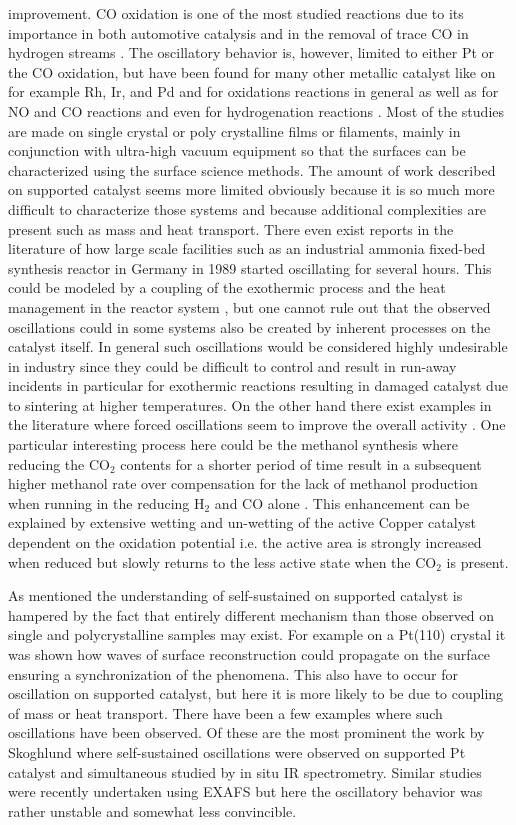 \documentclass[journal=jacsat,manuscript=article]{achemso}
\begin{document}
improvement. CO oxidation is one of the most studied reactions due to its
importance in both automotive catalysis and in the removal of trace CO in
hydrogen streams \cite{IbsBog}. The oscillatory behavior is, however, limited
to either Pt or the CO oxidation, but have been found for many other metallic
catalyst like on for example Rh, Ir, and Pd and for oxidations reactions in
general as well as for NO and CO reactions and even for hydrogenation reactions
\cite{Lund2000,SALES1982}. Most of the studies are made on single crystal or
poly crystalline films or filaments, mainly in conjunction with ultra-high
vacuum equipment so that the surfaces can be characterized using the surface
science methods. The amount of work described on supported catalyst seems more
limited obviously because it is so much more difficult to characterize those
systems and because additional complexities are present such as mass and heat
transport. There even exist reports in the literature of how large scale
facilities such as an industrial ammonia fixed-bed synthesis reactor in Germany
in 1989 started oscillating for several hours. This could be modeled by a
coupling of the exothermic process and the heat management in the reactor
system \cite{Morud1998}, but one cannot rule out that the observed oscillations
could in some systems also be created by inherent processes on the catalyst
itself. In general such oscillations would be considered highly undesirable in
industry since they could be difficult to control and result in run-away
incidents in particular for exothermic reactions resulting in damaged catalyst
due to sintering at higher temperatures. On the other hand there exist examples
in the literature where forced oscillations seem to improve the overall
activity \cite{IMBIHL1995,Machado2005} . One particular interesting process
here could be the methanol synthesis where reducing the CO$_2$ contents for a
shorter period of time result in a subsequent higher methanol rate over
compensation for the lack of methanol production when running in the reducing
H$_2$ and CO alone \cite{Dynamics-Bog}. This enhancement can be explained by
extensive wetting and un-wetting of the active Copper catalyst dependent on the
oxidation potential \cite{Hansen2002} i.e. the active area is strongly
increased when reduced but slowly returns to the less active state when the
CO$_2$ is present.

As mentioned the understanding of self-sustained on supported catalyst is
hampered by the fact that entirely different mechanism than those observed on
single and polycrystalline samples may exist. For example on a Pt(110) crystal
it was shown how waves of surface reconstruction could propagate on the
surface ensuring a synchronization of the phenomena. This also have to occur
for oscillation on supported catalyst, but here it is more likely to be due to
coupling of mass or heat transport. There have been a few examples where such
oscillations have been observed. Of these are the most prominent the work by
Skoghlund \cite{Carlsson2006} where self-sustained oscillations were observed
on supported Pt catalyst and simultaneous studied by in situ IR spectrometry.
Similar studies were recently undertaken using EXAFS \cite{Singh2010} but here
the oscillatory behavior was rather unstable and somewhat less convincible.
\end{document}
